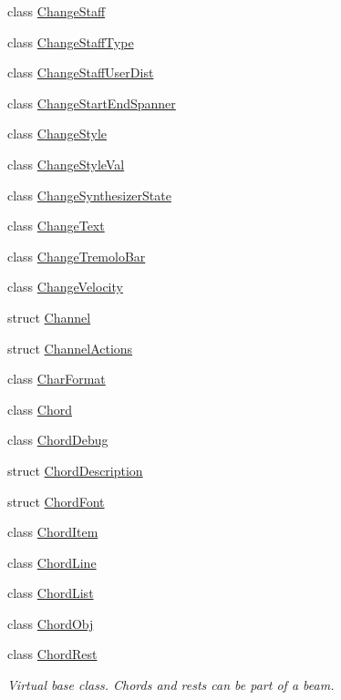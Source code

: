 \begin{DoxyCompactItemize}
\item 
class \hyperlink{class_ms_1_1_change_staff}{Change\+Staff}
\item 
class \hyperlink{class_ms_1_1_change_staff_type}{Change\+Staff\+Type}
\item 
class \hyperlink{class_ms_1_1_change_staff_user_dist}{Change\+Staff\+User\+Dist}
\item 
class \hyperlink{class_ms_1_1_change_start_end_spanner}{Change\+Start\+End\+Spanner}
\item 
class \hyperlink{class_ms_1_1_change_style}{Change\+Style}
\item 
class \hyperlink{class_ms_1_1_change_style_val}{Change\+Style\+Val}
\item 
class \hyperlink{class_ms_1_1_change_synthesizer_state}{Change\+Synthesizer\+State}
\item 
class \hyperlink{class_ms_1_1_change_text}{Change\+Text}
\item 
class \hyperlink{class_ms_1_1_change_tremolo_bar}{Change\+Tremolo\+Bar}
\item 
class \hyperlink{class_ms_1_1_change_velocity}{Change\+Velocity}
\item 
struct \hyperlink{struct_ms_1_1_channel}{Channel}
\item 
struct \hyperlink{struct_ms_1_1_channel_actions}{Channel\+Actions}
\item 
class \hyperlink{class_ms_1_1_char_format}{Char\+Format}
\item 
class \hyperlink{class_ms_1_1_chord}{Chord}
\item 
class \hyperlink{class_ms_1_1_chord_debug}{Chord\+Debug}
\item 
struct \hyperlink{struct_ms_1_1_chord_description}{Chord\+Description}
\item 
struct \hyperlink{struct_ms_1_1_chord_font}{Chord\+Font}
\item 
class \hyperlink{class_ms_1_1_chord_item}{Chord\+Item}
\item 
class \hyperlink{class_ms_1_1_chord_line}{Chord\+Line}
\item 
class \hyperlink{class_ms_1_1_chord_list}{Chord\+List}
\item 
class \hyperlink{class_ms_1_1_chord_obj}{Chord\+Obj}
\item 
class \hyperlink{class_ms_1_1_chord_rest}{Chord\+Rest}
\begin{DoxyCompactList}\small\item\em Virtual base class. Chords and rests can be part of a beam. \end{DoxyCompactList}\item 

\end{DoxyCompactItemize}

